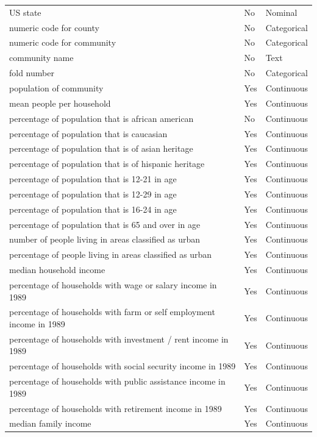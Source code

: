 \documentclass[
  11pt,
]{article}
\begin{document}
\begin{longtable}[t]{lll}
\endfoot
\bottomrule
\endlastfoot
US state & No & Nominal\\
numeric code for county & No & Categorical\\
numeric code for community & No & Categorical\\
community name & No & Text\\
fold number & No & Categorical\\
\addlinespace
population of community & Yes & Continuous\\
mean people per household & Yes & Continuous\\
percentage of population that is african american & No & Continuous\\
percentage of population that is caucasian & Yes & Continuous\\
percentage of population that is of asian heritage & Yes & Continuous\\
\addlinespace
percentage of population that is of hispanic heritage & Yes & Continuous\\
percentage of population that is 12-21 in age & Yes & Continuous\\
percentage of population that is 12-29 in age & Yes & Continuous\\
percentage of population that is 16-24 in age & Yes & Continuous\\
percentage of population that is 65 and over in age & Yes & Continuous\\
\addlinespace
number of people living in areas classified as urban & Yes & Continuous\\
percentage of people living in areas classified as urban & Yes & Continuous\\
median household income & Yes & Continuous\\
percentage of households with wage or salary income in 1989 & Yes & Continuous\\
percentage of households with farm or self employment income in 1989 & Yes & Continuous\\
\addlinespace
percentage of households with investment / rent income in 1989 & Yes & Continuous\\
percentage of households with social security income in 1989 & Yes & Continuous\\
percentage of households with public assistance income in 1989 & Yes & Continuous\\
percentage of households with retirement income in 1989 & Yes & Continuous\\
median family income & Yes & Continuous\\

\end{longtable}
\end{document}
